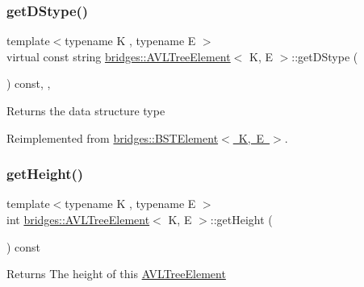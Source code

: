 \subsubsection{\texorpdfstring{get\+D\+Stype()}{getDStype()}}
{\footnotesize\ttfamily template$<$typename K , typename E $>$ \\
virtual const string \mbox{\hyperlink{classbridges_1_1_a_v_l_tree_element}{bridges\+::\+A\+V\+L\+Tree\+Element}}$<$ K, E $>$\+::get\+D\+Stype (\begin{DoxyParamCaption}{ }\end{DoxyParamCaption}) const\hspace{0.3cm}{\ttfamily [inline]}, {\ttfamily [override]}, {\ttfamily [virtual]}}

\begin{DoxyReturn}{Returns}
the data structure type 
\end{DoxyReturn}


Reimplemented from \mbox{\hyperlink{classbridges_1_1_b_s_t_element_af3843873c508c24f90b6e73a6f490bf8}{bridges\+::\+B\+S\+T\+Element$<$ K, E $>$}}.

\mbox{\label{classbridges_1_1_a_v_l_tree_element_ace72b436fa14db4f7844cc6e30b87aa7}} 
\subsubsection{\texorpdfstring{get\+Height()}{getHeight()}}
{\footnotesize\ttfamily template$<$typename K , typename E $>$ \\
int \mbox{\hyperlink{classbridges_1_1_a_v_l_tree_element}{bridges\+::\+A\+V\+L\+Tree\+Element}}$<$ K, E $>$\+::get\+Height (\begin{DoxyParamCaption}{ }\end{DoxyParamCaption}) const\hspace{0.3cm}{\ttfamily [inline]}}

\begin{DoxyReturn}{Returns}
The height of this \mbox{\hyperlink{classbridges_1_1_a_v_l_tree_element}{A\+V\+L\+Tree\+Element}} 
\end{DoxyReturn}
\mbox{\label{classbridges_1_1_a_v_l_tree_element_a7b5d05660da127f5f6164120d9846d90}} 
